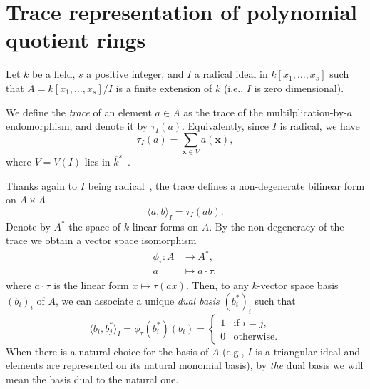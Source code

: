 \documentclass[12pt]{article}
\def\x {\ensuremath{\mathbf{x}}}
\newcommand{\ang}[1]{\langle#1\rangle}
\begin{document}

\section{Trace representation of polynomial quotient rings}

Let $k$ be a field, $s$ a positive integer, and $I$ a radical ideal in
$k[x_1,\dots,x_s]$ such that $A=k[x_1,\dots,x_s]/I$ is a finite
extension of $k$ (i.e., $I$ is zero dimensional).

We define the \emph{trace} of an element $a\in A$ as the trace of the
multilplication-by-$a$ endomorphism, and denote it by $\tau_I(a)$.
Equivalently, since $I$ is radical, we have
\begin{equation}\label{eq:tr}
\tau_{I}(a)=\sum_{\x \in V} a(\x),
\end{equation}
where $V=V(I)$ lies in $\overline{k}^s$~\cite{todo}.

Thanks again to $I$ being radical~\cite{todo}, the trace defines a
non-degenerate bilinear form on $A\times A$
\begin{equation}
  \label{eq:trace-def}
  \ang{a,b}_I = \tau_I(ab).
\end{equation}
Denote by $A^\ast$ the space of $k$-linear forms on $A$. By the
non-degeneracy of the trace we obtain a vector space isomorphism
\begin{equation}
  \label{eq:trace-isom}
  \begin{aligned}
  \phi_\tau : A &\to A^\ast,\\
            a &\mapsto a\cdot\tau,
  \end{aligned}
\end{equation}
where $a\cdot\tau$ is the linear form $x\mapsto\tau(ax)$. Then, to any
$k$-vector space basis $(b_i)_i$ of $A$, we can associate a unique
\emph{dual basis} $(b_i^\ast)_i$ such that
\begin{equation}
  \label{eq:dual-basis}
  \ang{b_i,b_j^\ast}_I = \phi_\tau(b_i^\ast)(b_i) = \begin{cases}
    1 &\text{if $i=j$,}\\
    0 &\text{otherwise}.
  \end{cases}
\end{equation}
When there is a natural choice for the basis of $A$ (e.g., $I$ is a
triangular ideal and elements are represented on its natural monomial
basis), by \emph{the} dual basis we will mean the basis dual to the
natural one.
\end{document}
